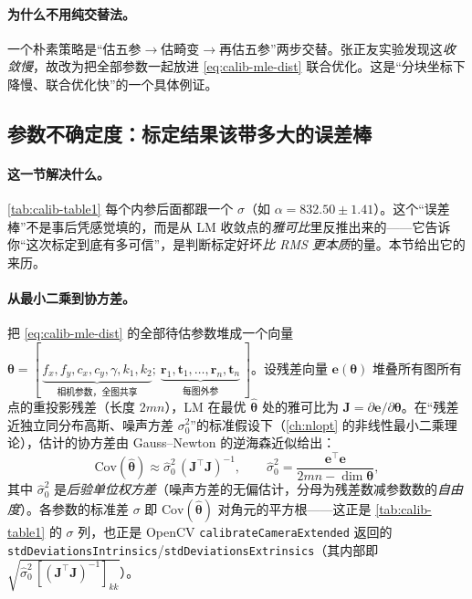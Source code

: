 \paragraph{为什么不用纯交替法。}
一个朴素策略是“估五参$\to$估畸变$\to$再估五参”两步交替。张正友实验发现这\emph{收敛慢}\cite{zhang2000calibration}，故改为把全部参数一起放进 \cref{eq:calib-mle-dist} 联合优化。这是“分块坐标下降慢、联合优化快”的一个具体例证。

\subsection{参数不确定度：标定结果该带多大的误差棒}
\label{sec:calib-uncertainty}

\paragraph{这一节解决什么。}
\cref{tab:calib-table1} 每个内参后面都跟一个 $\sigma$（如 $\alpha=832.50\pm1.41$）。这个“误差棒”不是事后凭感觉填的，而是从 LM 收敛点的\emph{雅可比}里反推出来的——它告诉你“这次标定到底有多可信”，是判断标定好坏\emph{比 RMS 更本质}的量。本节给出它的来历。

\paragraph{从最小二乘到协方差。}
把 \cref{eq:calib-mle-dist} 的全部待估参数堆成一个向量 $\boldsymbol{\theta}=[\,\underbrace{f_x,f_y,c_x,c_y,\gamma,k_1,k_2}_{\text{相机参数，全图共享}};\ \underbrace{\mathbf{r}_1,\mathbf{t}_1,\ldots,\mathbf{r}_n,\mathbf{t}_n}_{\text{每图外参}}\,]$。设残差向量 $\mathbf{e}(\boldsymbol{\theta})$ 堆叠所有图所有点的重投影残差（长度 $2mn$），LM 在最优 $\hat{\boldsymbol{\theta}}$ 处的雅可比为 $\mathbf{J}=\partial\mathbf{e}/\partial\boldsymbol{\theta}$。在“残差近独立同分布高斯、噪声方差 $\sigma_0^2$”的标准假设下（\cref{ch:nlopt} 的非线性最小二乘理论），估计的协方差由 Gauss--Newton 的逆海森近似给出：
\begin{equation}
  \mathrm{Cov}(\hat{\boldsymbol{\theta}}) \approx \hat\sigma_0^2\,(\mathbf{J}^\top\mathbf{J})^{-1},
  \qquad
  \hat\sigma_0^2 = \frac{\mathbf{e}^\top\mathbf{e}}{2mn - \dim\boldsymbol{\theta}},
  \label{eq:calib-covariance}
\end{equation}
其中 $\hat\sigma_0^2$ 是\emph{后验单位权方差}（噪声方差的无偏估计，分母为残差数减参数数的\emph{自由度}）。各参数的标准差 $\sigma$ 即 $\mathrm{Cov}(\hat{\boldsymbol{\theta}})$ 对角元的平方根——这正是 \cref{tab:calib-table1} 的 $\sigma$ 列\cite{zhang2000calibration}，也正是 OpenCV \texttt{calibrateCameraExtended} 返回的 \texttt{stdDeviationsIntrinsics}/\allowbreak\texttt{stdDeviationsExtrinsics}（其内部即 $\sqrt{\hat\sigma_0^2\,[(\mathbf{J}^\top\mathbf{J})^{-1}]_{kk}}$\cite{opencv2024calib}）。

